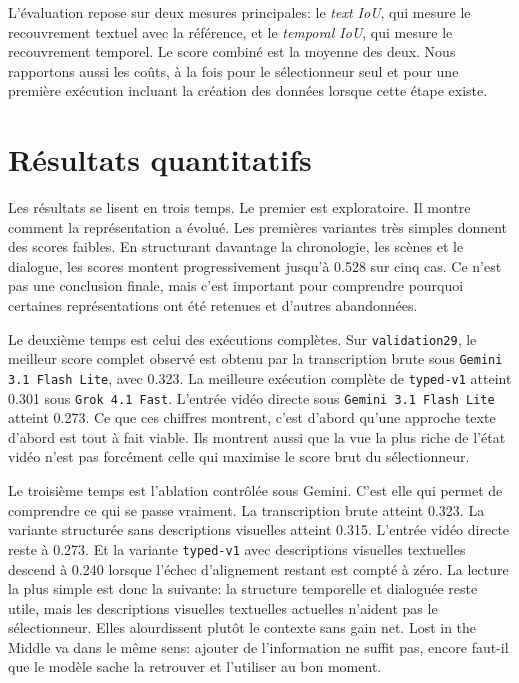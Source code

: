 L'\'evaluation repose sur deux mesures principales: le \emph{text IoU}, qui mesure le recouvrement textuel avec la r\'ef\'erence, et le \emph{temporal IoU}, qui mesure le recouvrement temporel. Le score combin\'e est la moyenne des deux. Nous rapportons aussi les co\^uts, \`a la fois pour le s\'electionneur seul et pour une premi\`ere ex\'ecution incluant la cr\'eation des donn\'ees lorsque cette \'etape existe.

\section{R\'esultats quantitatifs}









Les r\'esultats se lisent en trois temps. Le premier est exploratoire. Il montre comment la repr\'esentation a \'evolu\'e. Les premi\`eres variantes tr\`es simples donnent des scores faibles. En structurant davantage la chronologie, les sc\`enes et le dialogue, les scores montent progressivement jusqu'\`a 0.528 sur cinq cas. Ce n'est pas une conclusion finale, mais c'est important pour comprendre pourquoi certaines repr\'esentations ont \'et\'e retenues et d'autres abandonn\'ees.

Le deuxi\`eme temps est celui des ex\'ecutions compl\`etes. Sur \texttt{validation29}, le meilleur score complet observ\'e est obtenu par la transcription brute sous \texttt{Gemini 3.1 Flash Lite}, avec 0.323. La meilleure ex\'ecution compl\`ete de \texttt{typed-v1} atteint 0.301 sous \texttt{Grok 4.1 Fast}. L'entr\'ee vid\'eo directe sous \texttt{Gemini 3.1 Flash Lite} atteint 0.273. Ce que ces chiffres montrent, c'est d'abord qu'une approche texte d'abord est tout \`a fait viable. Ils montrent aussi que la vue la plus riche de l'\'etat vid\'eo n'est pas forc\'ement celle qui maximise le score brut du s\'electionneur.

Le troisi\`eme temps est l'ablation contr\^ol\'ee sous Gemini. C'est elle qui permet de comprendre ce qui se passe vraiment. La transcription brute atteint 0.323. La variante structur\'ee sans descriptions visuelles atteint 0.315. L'entr\'ee vid\'eo directe reste \`a 0.273. Et la variante \texttt{typed-v1} avec descriptions visuelles textuelles descend \`a 0.240 lorsque l'\'echec d'alignement restant est compt\'e \`a z\'ero. La lecture la plus simple est donc la suivante: la structure temporelle et dialogu\'ee reste utile, mais les descriptions visuelles textuelles actuelles n'aident pas le s\'electionneur. Elles alourdissent plut\^ot le contexte sans gain net. Lost in the Middle \cite{liu2024_lost} va dans le m\^eme sens: ajouter de l'information ne suffit pas, encore faut-il que le mod\`ele sache la retrouver et l'utiliser au bon moment.


